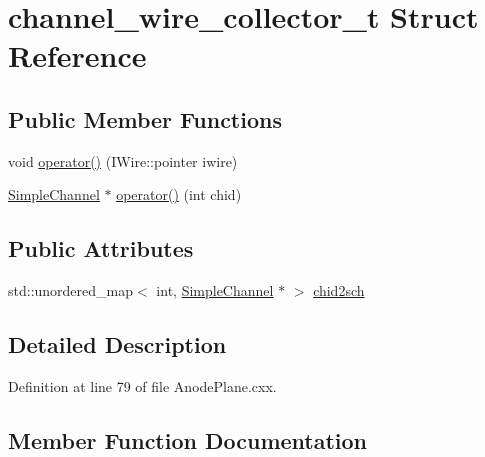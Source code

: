 \hypertarget{structchannel__wire__collector__t}{}\section{channel\+\_\+wire\+\_\+collector\+\_\+t Struct Reference}
\label{structchannel__wire__collector__t}
\subsection*{Public Member Functions}
\begin{DoxyCompactItemize}
\item 
void \hyperlink{structchannel__wire__collector__t_a1cce7e63f629acde348371a8fcca6092}{operator()} (I\+Wire\+::pointer iwire)
\item 
\hyperlink{class_wire_cell_1_1_simple_channel}{Simple\+Channel} $\ast$ \hyperlink{structchannel__wire__collector__t_a54e5aa177339537c693c20c8b103c38d}{operator()} (int chid)
\end{DoxyCompactItemize}
\subsection*{Public Attributes}
\begin{DoxyCompactItemize}
\item 
std\+::unordered\+\_\+map$<$ int, \hyperlink{class_wire_cell_1_1_simple_channel}{Simple\+Channel} $\ast$ $>$ \hyperlink{structchannel__wire__collector__t_a4f9a724ec5130b2e77444c63723caf08}{chid2sch}
\end{DoxyCompactItemize}


\subsection{Detailed Description}


Definition at line 79 of file Anode\+Plane.\+cxx.



\subsection{Member Function Documentation}
\mbox{\label{structchannel__wire__collector__t_a1cce7e63f629acde348371a8fcca6092}} 
